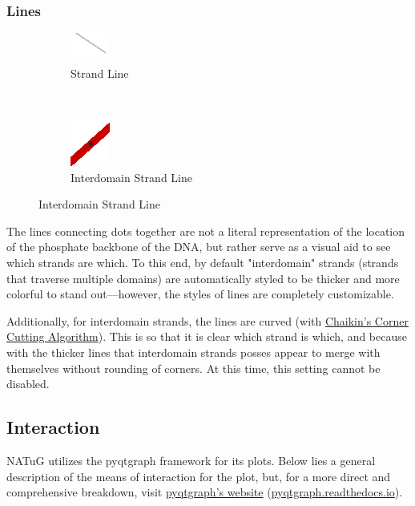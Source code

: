 \documentclass[
titlepage,
fontsize=12pt
]{article}
\begin{document}
	\subsubsection{Lines}

	\begin{figure}[h]
		\centering
		\caption{Side View Plot Line Graphics}
		\label{fig:side-view-plot-line-graphics}
		
		\begin{subfigure}{.4\linewidth}
			\centering
			\includegraphics[width=.3in]{strand-line.png}
			\caption{Strand Line}
			\label{fig:strand-line}
		\end{subfigure}%
		~
		\begin{subfigure}{.3\linewidth}
			\centering
			\includegraphics[width=.3in]{interdomain-strand-line.png}
			\caption{Interdomain Strand Line}
			\label{fig:interdomain-strand-line}
		\end{subfigure}
	\end{figure}

	The lines connecting dots together are not a literal representation of the location of the phosphate backbone of the DNA, but rather serve as a visual aid to see which strands are which. To this end, by default "interdomain" strands (strands that traverse multiple domains) are automatically styled to be thicker and more colorful to stand out—however, the styles of lines are completely customizable.
	
	Additionally, for interdomain strands, the lines are curved (with \href{https://www.cs.unc.edu/~dm/UNC/COMP258/LECTURES/Chaikins-Algorithm.pdf}{Chaikin's Corner Cutting Algorithm}). This is so that it is clear which strand is which, and because with the thicker lines that interdomain strands posses appear to merge with themselves without rounding of corners. At this time, this setting cannot be disabled.
	
	\subsection{Interaction} \label{sect:plot-interaction}
	NATuG utilizes the pyqtgraph framework for its plots. Below lies a general description of the means of interaction for the plot, but, for a more direct and comprehensive breakdown, visit \href{https://pyqtgraph.readthedocs.io/en/latest/user_guide/mouse_interaction.html}{pyqtgraph’s website} (\href{https://pyqtgraph.readthedocs.io/en/latest/user_guide/mouse_interaction.html}{pyqtgraph.readthedocs.io}).
	
\end{document}
